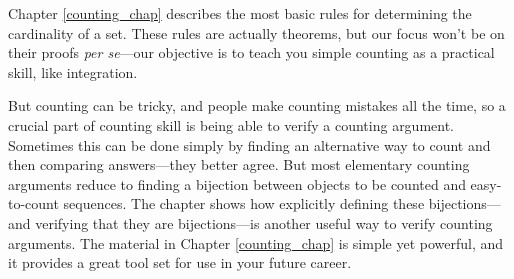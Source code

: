 \iffalse
In Chapter~\ref{chap:recurrences}, we show how to solve a variety of
recurrences that arise in computational problems.  These methods are
especially useful when you need to design or analyze recursive
programs.
\fi

Chapter \ref{counting_chap} describes the most basic rules for
determining the cardinality of a set.  These rules are actually
theorems, but our focus won't be on their proofs \emph{per se}---our
objective is to teach you simple counting as a practical skill, like
integration.

But counting can be tricky, and people make counting mistakes all the
time, so a crucial part of counting skill is being able to verify a
counting argument.  Sometimes this can be done simply by finding an
alternative way to count and then comparing answers---they better
agree.  But most elementary counting arguments reduce to finding a
bijection between objects to be counted and easy-to-count sequences.
The chapter shows how explicitly defining these bijections---and
verifying that they are bijections---is another useful way to verify
counting arguments.  The material in Chapter \ref{counting_chap} is
simple yet powerful, and it provides a great tool set for use in your
future career.


\iffalse
We conclude in Chapter~\ref{cardinality_chap} with a brief digression
into the final frontier of counting---infinity.  We'll define what it
means for a set to be countable and show you some examples of sets
that are really big---bigger even than the set of real numbers.
\fi

\endinput
